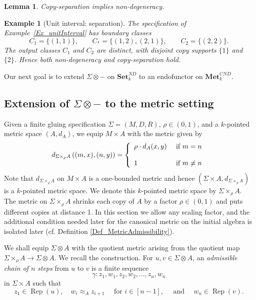 \documentclass{sn-jnl}%
\theoremstyle{thmstyleone}%
\newtheorem{lemma}[theorem]{Lemma}%
\theoremstyle{thmstyletwo}%
\newtheorem{example}{Example}%
\theoremstyle{thmstylethree}%
\newcommand{\setnd}{\mathbf{Set}_{k}^{ND}}
\newcommand{\mcnd}{\mathbf{Met}_{k}^{CND}}
\newcommand{\M}{\Sigma}
\newcommand{\F}{\M\otimes}
\newcommand{\Mw}{\M\times_{\w}}
\newcommand{\dm}[1]{d_{\M \times_{\w} #1}}
\newcommand{\w}{\rho}
\begin{document}
\begin{lemma}
\label{Lem_CSImpliesNDButNotConversely}
Copy-separation implies non-degeneracy.
\end{lemma}

\begin{example}[Unit interval: separation]
\label{Ex_IntervalSeparation}
    The specification of Example~\ref{Ex_unitInterval} has boundary classes
    \begin{equation} \nonumber
        C_1=\{(1,1)\}, \qquad C_*=\{(1,2),(2,1)\}, \qquad C_2=\{(2,2)\}.
    \end{equation}
    The output classes $C_1$ and $C_2$ are distinct, with disjoint copy supports $\{1\}$ and $\{2\}$. Hence both non-degeneracy and copy-separation hold.
\end{example}

Our next goal is to extend $\F-$ on $\setnd$ to an endofunctor on $\mcnd$.

\subsection{Extension of $\M\otimes -$ to the metric setting}

Given a finite gluing specification $\Sigma=(M,D,R)$, $\w \in (0,1)$, and a $k$-pointed metric space $(A, d_A)$, we equip $M\times A$ with the metric given by
\begin{equation}
\nonumber
    \dm{A}\left((m,x),(n,y)\right)=\left\{
    \begin{array}{ll}
        \w \cdot d_A(x,y) & \text{ if }m=n \\
                            & \\
        1 & \hbox{ if } m\neq n
    \end{array}
    \right.
\end{equation}
Note that $\dm{A}$ on $M\times A$ is a one-bounded metric and hence $\left(\M\times A, \dm{A} \right) $ is a $k$-pointed metric space. We denote this $k$-pointed metric space by $\Mw A$. The metric on $\Mw A$ shrinks each copy of $A$ by a factor $\w \in (0, 1)$ and puts different copies at distance 1. In this section we allow any scaling factor, and the additional condition needed later for the canonical metric on the initial algebra is isolated later (cf. Definition \ref{Def_MetricAdmissibility}).

We shall equip $\F A$ with the quotient metric arising from the quotient map $\Mw A \to \F A$. We recall the construction. For $u,v\in \M \otimes A$, an \emph{admissible chain of $n$ steps} from $u$ to $v$ is a finite sequence
\begin{equation}
     \gamma : z_1,w_1,z_2,w_2,\ldots,z_n,w_n
\label{Eqn_paths}
\end{equation}
in $\M \times A$ such that
\begin{equation}
    z_1\in\operatorname{Rep}(u),\quad w_i\approx_A z_{i+1} \quad \text{ for } i\in[n-1],\quad \text{ and } \quad w_n\in\operatorname{Rep}(v).
\label{eqn:conditions on admisible chain}
\end{equation}
\end{document}
